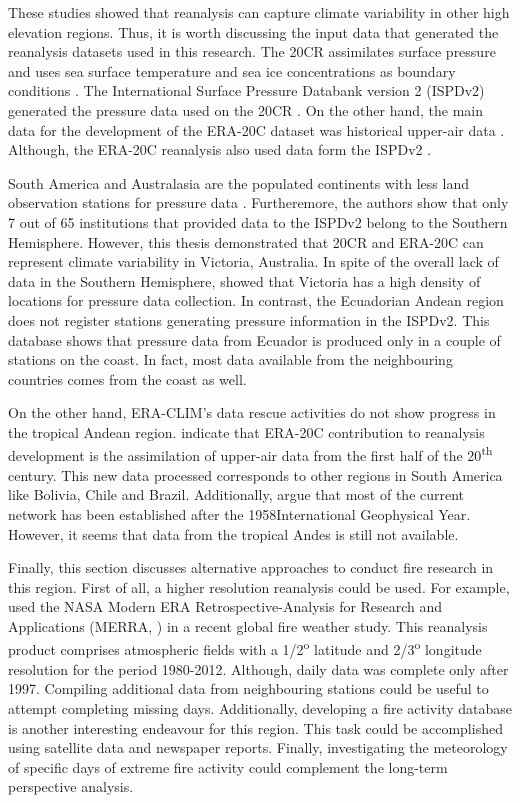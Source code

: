 These studies showed that reanalysis can capture climate variability
in other high elevation regions. Thus, it is worth discussing the
input data that generated the reanalysis datasets used in this research.
The 20CR assimilates surface pressure and uses sea surface temperature
and sea ice concentrations as boundary conditions \citep{Compo2011}.
The International Surface Pressure Databank version 2 (ISPDv2) generated
the pressure data used on the 20CR \citep*{Cram2015}. On the other
hand, the main data for the development of the ERA-20C dataset was
historical upper-air data \citep*{Stickler2014,Stickler2014a}. Although,
the ERA-20C reanalysis also used data form the ISPDv2 \citep*{Poli2013,Cram2015}. 

South America and Australasia are the populated continents with less
land observation stations for pressure data \citep*{Cram2015}. Furtheremore,
the authors show that only 7 out of 65 institutions that provided
data to the ISPDv2 belong to the Southern Hemisphere. However, this
thesis demonstrated that 20CR and ERA-20C can represent climate variability
in Victoria, Australia. In spite of the overall lack of data in the
Southern Hemisphere, \citet*{Cram2015} showed that Victoria has a
high density of locations for pressure data collection. In contrast,
the Ecuadorian Andean region does not register stations generating
pressure information in the ISPDv2. This database shows that pressure
data from Ecuador is produced only in a couple of stations on the
coast. In fact, most data available from the neighbouring countries
comes from the coast as well. 

On the other hand, ERA-CLIM's data rescue activities do not show progress
in the tropical Andean region. \citet*{Stickler2014} indicate that
ERA-20C contribution to reanalysis development is the assimilation
of upper-air data from the first half of the 20\textsuperscript{th}
century. This new data processed corresponds to other regions in South
America like Bolivia, Chile and Brazil. Additionally, \citet*{Stickler2014}
argue that most of the current network has been established after
the 1958\textemdash International Geophysical Year\textemdash . However,
it seems that data from the tropical Andes is still not available.

Finally, this section discusses alternative approaches to conduct
fire research in this region. First of all, a higher resolution reanalysis
could be used. For example, \citet*{Field2015} used the NASA Modern
ERA Retrospective-Analysis for Research and Applications (MERRA, \citet{Rienecker2011})
in a recent global fire weather study. This reanalysis product comprises
atmospheric fields with a 1/2\textsuperscript{o} latitude and 2/3\textsuperscript{o}
longitude resolution for the period 1980-2012. Although, daily data
was complete only after 1997. Compiling additional data from neighbouring
stations could be useful to attempt completing missing days. Additionally,
developing a fire activity database is another interesting endeavour
for this region. This task could be accomplished using satellite data
and newspaper reports. Finally, investigating the meteorology of specific
days of extreme fire activity could complement the long-term perspective
analysis. 


